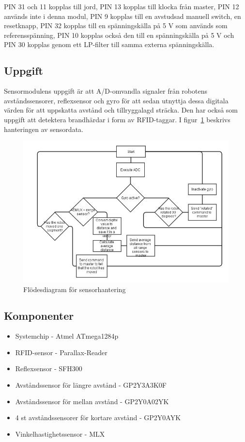 \documentclass[a4paper,12pt,fleqn]{article}
\begin{document}
PIN 31 och 11 kopplas till jord, PIN 13 kopplas till klocka från master, PIN 12 används inte i denna modul, PIN 9 kopplas till en avstudsad manuell switch, en resetknapp, PIN 32 kopplas till en spänningskälla på 5 V som används som referensspänning, PIN 10 kopplas också den till en spänningskälla på 5 V och PIN 30 kopplas genom ett LP-filter till samma externa spänningskälla.


\subsection{Uppgift}
Sensormodulens uppgift är att A/D-omvandla signaler från robotens avståndssensorer, reflexsensor och gyro för att sedan utnyttja dessa digitala värden för att uppskatta avstånd och tillryggalagd sträcka. Den har också som uppgift att detektera brandhärdar i form av RFID-taggar. I figur~\ref{fig:sensorflow} beskrivs hanteringen av sensordata.

\begin{figure}[htp] %
  \begin{center}
  \includegraphics[keepaspectratio=true,width=0.6\linewidth]{bilder/sensorflode}  %
  \end{center}
  \caption{Flödesdiagram för sensorhantering} %
  \label{fig:sensorflow}
\end{figure}

\subsection{Komponenter}
\begin{itemize}
	\item Systemchip - Atmel ATmega1284p
	\item RFID-sensor - Par\-all\-ax-Read\-er\
	\item Reflexsensor - SFH300
	\item Avståndssensor för längre avstånd - GP\-2Y3A\-3K\-0F
	\item Avståndssensor för mellan avstånd - GP2Y0A02YK
	\item 4 st avståndssensorer för kortare avstånd - GP\-2Y\-0A\-YK
	\item Vinkelhastighetssensor - MLX\-90\-609
\end{itemize}
~\\
\end{document}
